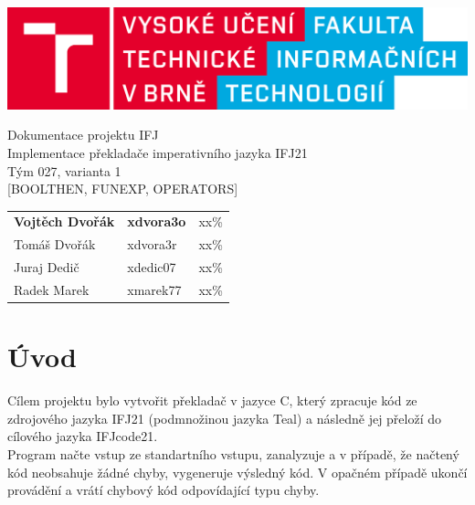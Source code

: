 \documentclass[11pt]{article}
\begin{document}
    \begin{titlepage}
        \begin{center}
            \includegraphics[width=1\linewidth]{fit logo.png} \\
            
            
            \Huge{Dokumentace projektu IFJ} \\ 
            \LARGE{Implementace překladače imperativního jazyka IFJ21} \\
            \Large{Tým 027, varianta 1} \\
            \Large{[BOOLTHEN, FUNEXP, OPERATORS]}
            
        \end{center}
        \hfill
        \begin{center}
        \LARGE
            \begin{tabular}{l  l  l}
                \textbf{Vojtěch Dvořák} & \textbf{xdvora3o} & \; xx\% \\
                 Tomáš Dvořák & xdvora3r & \; xx\% \\
                 Juraj Dedič &  xdedic07 & \; xx\% \\
                 Radek Marek & xmarek77 & \; xx\%
            \end{tabular}
        \end{center}
    \end{titlepage}
    
    \setcounter{page}{1}
    \tableofcontents
    \clearpage
    
    \section{Úvod}
        Cílem projektu bylo vytvořit překladač v jazyce C, který zpracuje kód ze zdrojového jazyka IFJ21 (podmnožinou jazyka Teal) a následně jej přeloží do cílového jazyka IFJcode21. \\
    	\indent Program načte vstup ze standartního vstupu, zanalyzuje a v případě, že načtený kód neobsahuje žádné chyby, vygeneruje výsledný kód. V opačném případě ukončí provádění a vrátí chybový kód odpovídající typu chyby.
	
\end{document}
